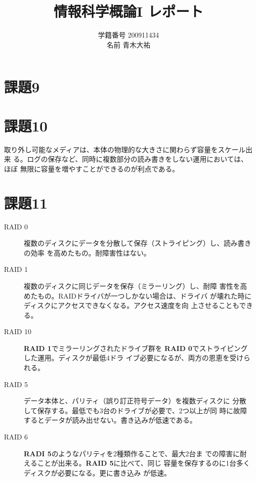 \documentclass[a4j,9pt]{jsarticle}
\title{情報科学概論I レポート}
\author{学籍番号 200911434 \\ 名前 青木大祐}
\begin{document}
\maketitle
\setcounter{section}{8}
\section{課題9}
\vspace{6cm}
\section{課題10}
取り外し可能なメディアは、本体の物理的な大きさに関わらず容量をスケール出来
る。ログの保存など、同時に複数部分の読み書きをしない運用においては、ほぼ
無限に容量を増やすことができるのが利点である。

\section{課題11}
\begin{description}
 \item[RAID 0] 複数のディスクにデータを分散して保存（ストライピング）し、読み書きの効率
            を高めたもの。耐障害性はない。
 \item[RAID 1] 複数のディスクに同じデータを保存（ミラーリング）し、耐障
            害性を高めたもの。RAIDドライバが一つしかない場合は、ドライバ
            が壊れた時にディスクにアクセスできなくなる。アクセス速度を向
            上させることもできる。
 \item[RAID 10] \textbf{RAID 1}でミラーリングされたドライブ群を
            \textbf{RAID 0}でストライピングした運用。ディスクが最低4ドラ
            イブ必要になるが、両方の恩恵を受けられる。
 \item[RAID 5] 
            データ本体と、パリティ（誤り訂正符号データ）を複数ディスクに
            分散して保存する。最低でも3台のドライブが必要で、2つ以上が同
            時に故障するとデータが読み出せない。書き込みが低速である。
 \item[RAID 6] 
            \textbf{RADI 5}のようなパリティを2種類作ることで、最大2台ま
            での障害に耐えることが出来る。\textbf{RAID 5}に比べて、同じ
            容量を保存するのに1台多くディスクが必要になる。更に書き込み
            が低速。

\end{description}
\end{document}
